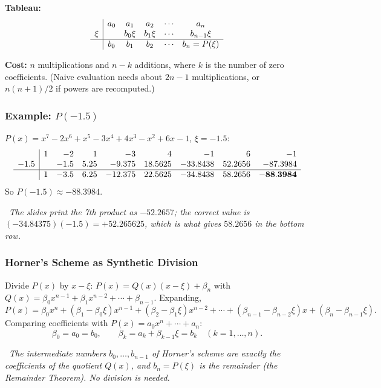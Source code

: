 \documentclass[hidelinks]{article}
\newcommand{\callout}[1]{\par\smallskip\noindent{\color{capri}$\blacktriangleright$}\ \textit{#1}\par\smallskip}
\begin{document}
\textbf{Tableau:}
\[
\begin{array}{c|ccccc}
 & a_0 & a_1 & a_2 & \cdots & a_n\\
\xi & & b_0\xi & b_1\xi & \cdots & b_{n-1}\xi\\ \hline
 & b_0 & b_1 & b_2 & \cdots & b_n=P(\xi)\\
\end{array}
\]

\textbf{Cost:} $n$ multiplications and $n-k$ additions, where $k$ is the number of zero coefficients. (Naive evaluation needs about $2n-1$ multiplications, or $n(n+1)/2$ if powers are recomputed.)

\subsubsection{Example: $P(-1.5)$}

$P(x)=x^7-2x^6+x^5-3x^4+4x^3-x^2+6x-1$, $\xi=-1.5$:
\[
\begin{array}{c|rrrrrrrr}
 & 1 & -2 & 1 & -3 & 4 & -1 & 6 & -1\\
-1.5 & & -1.5 & 5.25 & -9.375 & 18.5625 & -33.8438 & 52.2656 & -87.3984\\ \hline
 & 1 & -3.5 & 6.25 & -12.375 & 22.5625 & -34.8438 & 58.2656 & \mathbf{-88.3984}\\
\end{array}
\]
So $P(-1.5)\approx-88.3984$.

\callout{The slides print the 7th product as $-52.2657$; the correct value is $(-34.84375)(-1.5)=+52.265625$, which is what gives $58.2656$ in the bottom row.}

\subsubsection{Horner's Scheme as Synthetic Division}

Divide $P(x)$ by $x-\xi$: $P(x)=Q(x)(x-\xi)+\beta_n$ with $Q(x)=\beta_0x^{n-1}+\beta_1x^{n-2}+\cdots+\beta_{n-1}$. Expanding,
\[
P(x)=\beta_0x^n+(\beta_1-\beta_0\xi)x^{n-1}+(\beta_2-\beta_1\xi)x^{n-2}+\cdots+(\beta_{n-1}-\beta_{n-2}\xi)x+(\beta_n-\beta_{n-1}\xi).
\]
Comparing coefficients with $P(x)=a_0x^n+\cdots+a_n$:
\[
\beta_0=a_0=b_0,\qquad \beta_k=a_k+\beta_{k-1}\xi=b_k\quad(k=1,\dots,n).
\]

\callout{The intermediate numbers $b_0,\dots,b_{n-1}$ of Horner's scheme are exactly the coefficients of the quotient $Q(x)$, and $b_n=P(\xi)$ is the remainder (the Remainder Theorem). No division is needed.}
\end{document}
